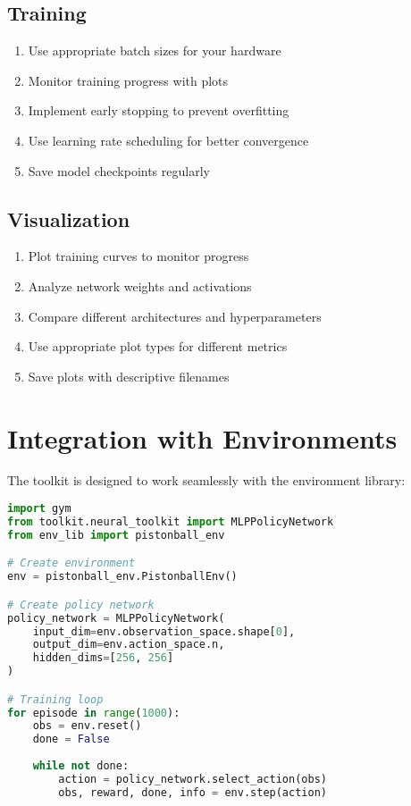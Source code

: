 \subsection{Training}

\begin{enumerate}
    \item Use appropriate batch sizes for your hardware
    \item Monitor training progress with plots
    \item Implement early stopping to prevent overfitting
    \item Use learning rate scheduling for better convergence
    \item Save model checkpoints regularly
\end{enumerate}

\subsection{Visualization}

\begin{enumerate}
    \item Plot training curves to monitor progress
    \item Analyze network weights and activations
    \item Compare different architectures and hyperparameters
    \item Use appropriate plot types for different metrics
    \item Save plots with descriptive filenames
\end{enumerate}

\section{Integration with Environments}

The toolkit is designed to work seamlessly with the environment library:

\begin{lstlisting}[language=python, caption=Environment integration]
import gym
from toolkit.neural_toolkit import MLPPolicyNetwork
from env_lib import pistonball_env

# Create environment
env = pistonball_env.PistonballEnv()

# Create policy network
policy_network = MLPPolicyNetwork(
    input_dim=env.observation_space.shape[0],
    output_dim=env.action_space.n,
    hidden_dims=[256, 256]
)

# Training loop
for episode in range(1000):
    obs = env.reset()
    done = False
    
    while not done:
        action = policy_network.select_action(obs)
        obs, reward, done, info = env.step(action)
\end{lstlisting} 